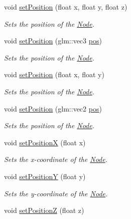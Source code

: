 \begin{DoxyCompactItemize}
void \mbox{\hyperlink{classsage_1_1Node_ad9899110e543c6b16997512e47c142c9}{set\+Position}} (float x, float y, float z)
\begin{DoxyCompactList}\small\item\em Sets the position of the \mbox{\hyperlink{classsage_1_1Node}{Node}}. \end{DoxyCompactList}\item 
void \mbox{\hyperlink{classsage_1_1Node_a12f5d88d221aa5db70c2bd53f6dc049a}{set\+Position}} (glm\+::vec3 \mbox{\hyperlink{classsage_1_1Node_a26c32e5ec11e0ed7f33053ecac6830d5}{pos}})
\begin{DoxyCompactList}\small\item\em Sets the position of the \mbox{\hyperlink{classsage_1_1Node}{Node}}. \end{DoxyCompactList}\item 
void \mbox{\hyperlink{classsage_1_1Node_aaa8545c103ef1b35e5076dbedab93af5}{set\+Position}} (float x, float y)
\begin{DoxyCompactList}\small\item\em Sets the position of the \mbox{\hyperlink{classsage_1_1Node}{Node}}. \end{DoxyCompactList}\item 
void \mbox{\hyperlink{classsage_1_1Node_ae2731cefe38e706c2bf21afae6da18b3}{set\+Position}} (glm\+::vec2 \mbox{\hyperlink{classsage_1_1Node_a26c32e5ec11e0ed7f33053ecac6830d5}{pos}})
\begin{DoxyCompactList}\small\item\em Sets the position of the \mbox{\hyperlink{classsage_1_1Node}{Node}}. \end{DoxyCompactList}\item 
void \mbox{\hyperlink{classsage_1_1Node_ae1dfc73d6122a95778d5d9db3d1fd913}{set\+PositionX}} (float x)
\begin{DoxyCompactList}\small\item\em Sets the x-\/coordinate of the \mbox{\hyperlink{classsage_1_1Node}{Node}}. \end{DoxyCompactList}\item 
void \mbox{\hyperlink{classsage_1_1Node_a5c97d36655f0daa71a5f6c715d2b0470}{set\+PositionY}} (float y)
\begin{DoxyCompactList}\small\item\em Sets the y-\/coordinate of the \mbox{\hyperlink{classsage_1_1Node}{Node}}. \end{DoxyCompactList}\item 
void \mbox{\hyperlink{classsage_1_1Node_a0dd2e816d50418b9b63a78fdf166ba53}{set\+PositionZ}} (float z)

\end{DoxyCompactItemize}
